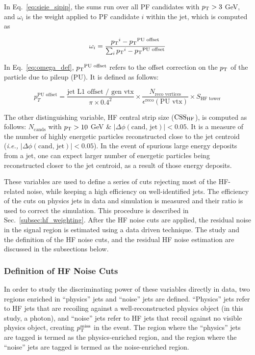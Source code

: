 In Eq.~\ref{eq:sieie_sipip}, the sums run over all PF candidates with $p_{\textrm{T}} > 3$ GeV, and 
$\omega_i$ is the weight applied to PF candidate $i$ within the jet, which is computed as

\begin{equation}
    \omega_i = \frac{{p_{\textrm{T}}}^i - {p_{\textrm{T}}}^{\text{PU offset}}}{\sum_{i} {p_{\textrm{T}}}^{i} - {p_{\textrm{T}}}^{\text{PU offset}} }
    \label{eq:omega_def}
\end{equation}

In Eq.~\ref{eq:omega_def}, ${p_{\textrm{T}}}^{\text{PU offset}}$ refers to the offset correction on the $p_{\textrm{T}}$ of the particle 
due to pileup (PU). It is defined as follows:

\begin{equation}
    p_T^{\text{PU offset}} = \frac{\text{jet L1 offset / gen vtx}}{\pi \times 0.4^2} \times \frac{N_{\text{reco vertices}}}{\epsilon^{\text{reco}}(\text{PU vtx})} \times S_{\text{HF tower}}
\end{equation}

The other distinguishing variable, HF central strip size ($\mathrm{CSS_{HF}}$), is computed as follows: 
$N_{\textrm{cands}}$ with $p_{\textrm{T}} > 10$ GeV \& $|\Delta\phi(\textrm{cand, jet})| < 0.05$. It is a measure of the number of
highly energetic particles reconstructed close to the jet centroid (\textit{i.e.,} $|\Delta\phi(\textrm{cand, jet})| < 0.05$).
In the event of spurious large energy deposits from a jet, one can expect larger number of energetic particles
being reconstructed closer to the jet centroid, as a result of those energy deposits.

These variables are used to define a series of cuts rejecting most of the HF-related noise, while keeping a high efficiency on well-identified jets. 
The efficiency of the cuts on physics jets in data and simulation is measured and their ratio is used to correct the simulation.
This procedure is described in Sec.~\ref{subsec:hf_weighting}. After the HF noise cuts are applied, the residual noise in the signal region is estimated using a data driven technique.
The study and the definition of the HF noise cuts, and the residual HF noise estimation are discussed in the subsections below. 

\subsubsection{Definition of HF Noise Cuts}

In order to study the discriminating power of these variables directly in data, two regions enriched in ``physics'' jets and ``noise'' jets are defined. ``Physics'' jets
refer to HF jets that are recoiling against a well-reconstructed physics object (in this study, a photon), and ``noise'' jets 
refer to HF jets that recoil against no visible physics object, creating $p_{\textrm{T}}^{\textrm{miss}}$ in the event. The region where the ``physics'' jets are tagged
is termed as the physics-enriched region, and the region where the ``noise'' jets are tagged is termed as the noise-enriched region.

